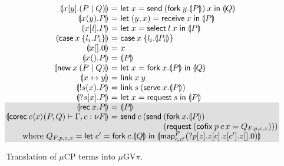 \documentclass[orivec,envcountsame]{llncs}
\makeatletter
\newcommand{\cptyp}[2]{#1 \vdash #2}
\newcommand{\mapname}{\mathsf{map}}
\newcommand{\map}[3]{\mapname^{#1}_{#2}(#3)}
\newcommand{\mkwd}[1]{\mathsf{#1}}
\newcommand{\link}[2]{#1 \leftrightarrow #2}
\newcommand{\cut}[4]{\mkwd{new}\:#1 \: (#3 \mid #4)}
\newcommand{\replicate}[2]{{!#1(#2)}}
\newcommand{\derelict}[2]{{?#1[#2]}}
\newcommand{\rec}[1]{\mkwd{rec}\:#1}
\newcommand{\corec}[5]{\mkwd{corec}\:#1 \langle #2 \rangle (#4,#5)}
\newcommand{\clabel}[1]{\mathit{#1}}
\renewcommand{\case}[2]{\mkwd{case}\:#1\:\{#2\}}
\newcommand{\sel}[2]{#1[\clabel{#2}]}
\newcommand{\gvsend}[2]{\mkwd{send}\:#1\:#2}
\newcommand{\gvreceive}[1]{\mkwd{receive}\:#1}
\newcommand{\gvlet}[3]{\mkwd{let}\;#1 = #2\;\mkwd{in}\;#3}
\newcommand{\gvselect}[2]{\mkwd{select}\:#1\:#2}
\newcommand{\gvcase}[2]{\mkwd{case}\:#1\:\{#2\}}
\newcommand{\gvlink}[2]{\mkwd{link}\:#1\:#2}
\newcommand{\gvfork}[2]{\mkwd{fork}\:#1.#2}
\newcommand{\lrkwd}{\mkwd{cofix}}
\newcommand{\gvfix}[3]{\lrkwd\:#1\:#2 = #3}
\newcommand{\gvserve}[2]{\mkwd{serve}\:#1.#2}
\newcommand{\gvrequest}[1]{\mkwd{request}\:#1}
\newcommand{\key}{\mkwd}
\newcommand{\togv}[1]{\llparenthesis #1 \rrparenthesis}
\newcommand{\mucp}{$\mu\mathrm{CP}$\xspace}
\newcommand{\gvpi}{$\mu\mathrm{GV}\pi$\xspace}
\newcommand{\ba}{\begin{array}}
\newcommand{\ea}{\end{array}}
\newcommand{\bl}{\ba[t]{@{}l@{}}}
\newcommand{\el}{\ea}
\newenvironment{equations}{\[\ba{@{}r@{~}c@{~}l@{}}}{\ea\]}
\newcommand\shaderow{\noalign{\vskip-0.4pt}\rowcolor{shade}[0.6mm]}
\makeatother
\begin{document}
\begin{figure}[float]\small
\begin{equations}
  \togv{x[y].(P \mid Q)} &=&
    \gvlet{x}{\gvsend{(\gvfork{y}{\togv{P}})}{x}}{\togv{Q}} \\
  \togv{x(y).P} &=&
    \gvlet{(y,x)}{\gvreceive{x}}{\togv{P}} \\
  \togv{\sel{x}{\mathit{l}}.P} &=&
    \gvlet{x}{\gvselect{l}{x}}{\togv{P}} \\
  \togv{\case{x}{l_i.P_i}} &=&
    \gvcase{x}{l_i.\togv{P_i}} \\
  \togv{x[].0} &=& x \\
  \togv{x().P} &=& \togv{P} \\
  \togv{\cut{x}{}{P}{Q}} &=&
    \gvlet{x}{\gvfork{x}{\togv{P}}}{\togv{Q}} \\
  \togv{\link{x}{y}} &=& \gvlink{x}{y} \\
  \togv{\replicate{s}{x}.P} &=&
    \gvlink{s}{(\gvserve{x}{\togv{P}})} \\
  \togv{\derelict{s}{x}.P} &=&
    \gvlet{x}{\gvrequest{s}}{\togv{P}} \\ \shaderow
  \togv{\rec{x}.P} &=& \togv{P} \\ \shaderow
  \togv{\cptyp{\corec{c}{x}{}{P}{Q}}{\Gamma, c:\nu F}} &=&
    \key{send}\:c\:(
      \key{send}\:
         \bl
         (\gvfork{x}{\togv{P}}) \\
         (\gvrequest{(\gvfix{p}{c\,x}{Q_{F,p,c,x}})})) \\
         \el \\ \shaderow
\multicolumn{3}{@{}l@{}}
{\qquad\text{where }
  Q_{F,p,c,x} =
    \gvlet{c'}{\gvfork{c}{\togv{Q}}}
          {\togv{\map{F}{c,c'}{\derelict{p}{z}.z[c].z[c'].z[].0}}}}
\end{equations}%
\caption{Translation of \mucp terms into \gvpi.}\label{fig:fromcp}
\end{figure}
\end{document}
